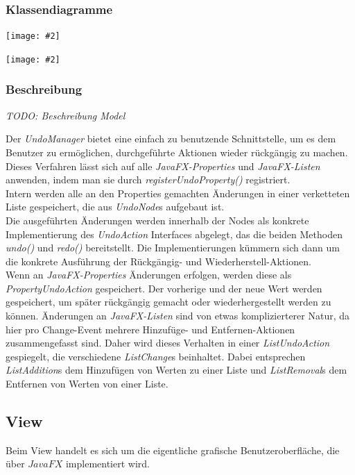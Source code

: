 \documentclass[11pt]{article}
\newcommand{\includediagram}[2]{
	\begin{center}
		\texttt{[image: \#2]}
	\end{center}
}
\begin{document}
\subsubsection{Klassendiagramme}

\includediagram{1.0}{model-main.png}

\includediagram{1.0}{model-undo.png}

\subsubsection{Beschreibung}

\textit{TODO: Beschreibung Model}

Der \textit{UndoManager} bietet eine einfach zu benutzende Schnittstelle, um es dem Benutzer zu ermöglichen, durchgeführte Aktionen wieder rückgängig zu machen. Dieses Verfahren lässt sich auf alle \textit{JavaFX-Properties} und \textit{JavaFX-Listen} anwenden, indem man sie durch \textit{registerUndoProperty()} registriert.\\
Intern werden alle an den Properties gemachten Änderungen in einer verketteten Liste gespeichert, die aus \textit{UndoNode}s aufgebaut ist.\\
Die ausgeführten Änderungen werden innerhalb der Nodes als konkrete Implementierung des \textit{UndoAction} Interfaces abgelegt, das die beiden Methoden \textit{undo()} und \textit{redo()} bereitstellt. Die Implementierungen kümmern sich dann um die konkrete Ausführung der Rückgängig- und Wiederherstell-Aktionen.\\
Wenn an \textit{JavaFX-Properties} Änderungen erfolgen, werden diese als \textit{PropertyUndoAction} gespeichert. Der vorherige und der neue Wert werden gespeichert, um später rückgängig gemacht oder wiederhergestellt werden zu können.
Änderungen an \textit{JavaFX-Listen} sind von etwas komplizierterer Natur, da hier pro Change-Event mehrere Hinzufüge- und Entfernen-Aktionen zusammengefasst sind. Daher wird dieses Verhalten in einer \textit{ListUndoAction} gespiegelt, die verschiedene \textit{ListChange}s beinhaltet. Dabei entsprechen \textit{ListAddition}s dem Hinzufügen von Werten zu einer Liste und \textit{ListRemoval}s dem Entfernen von Werten von einer Liste.

\subsection{View}

Beim View handelt es sich um die eigentliche grafische Benutzeroberfläche, die über $\textit{JavaFX}$ implementiert wird.
\end{document}
